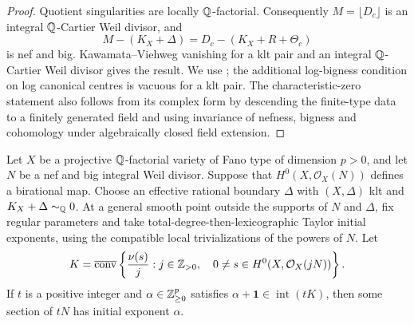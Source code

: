 \begin{proof}
Quotient singularities are locally $\mathbb Q$-factorial.  Consequently
$M=\lfloor D_c\rfloor$ is an integral $\mathbb Q$-Cartier Weil divisor,
and
\[
 M-(K_X+\Delta)
   =D_c-(K_X+R+\Theta_c)
\]
is nef and big.  Kawamata--Viehweg vanishing for a klt pair and an
integral $\mathbb Q$-Cartier Weil divisor gives the result.  We use \cite[Theorem~3.2.4, manuscript version of 9 October 2023]{FujinoVanishing};
the additional log-bigness condition on log canonical centres is
vacuous for a klt pair.  The characteristic-zero statement also follows
from its complex form by descending the finite-type data to a finitely
generated field and using invariance of nefness, bigness and cohomology
under algebraically closed field extension.
\end{proof}

\begin{lemma}\label{lem:C-adjoint-lattice}
Let $X$ be a projective $\mathbb Q$-factorial variety of Fano type of
dimension $p>0$, and let $N$ be a nef and big integral Weil divisor.
Suppose that $H^0(X,\mathcal O_X(N))$ defines a birational map.
Choose an effective rational boundary $\Delta$ with $(X,\Delta)$ klt
and $K_X+\Delta\sim_{\mathbb Q}0$.  At a general smooth point outside
the supports of $N$ and $\Delta$, fix regular parameters and take
total-degree-then-lexicographic Taylor initial exponents, using the
compatible local trivializations of the powers of $N$.  Let
\[
 K=\overline{\operatorname{conv}}
 \left\{\frac{\nu(s)}j:
 j\in\mathbb Z_{>0},\quad
 0\ne s\in H^0(X,\mathcal O_X(jN))\right\}.
\]
If $t$ is a positive integer and $\alpha\in\mathbb Z_{\ge0}^p$ satisfies
$\alpha+\mathbf1\in\operatorname{int}(tK)$, then some section of
$tN$ has initial exponent $\alpha$.
\end{lemma}

